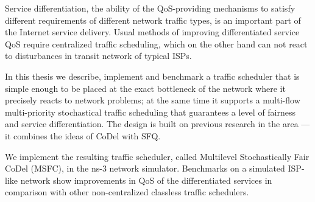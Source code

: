 Service differentiation, the ability of the QoS-providing mechanisms to satisfy different requirements of different network traffic types, is an important part of the Internet service delivery. Usual methods of improving differentiated service QoS require centralized traffic scheduling, which on the other hand can not react to disturbances in transit network of typical ISPs.

In this thesis we describe, implement and benchmark a traffic scheduler that is simple enough to be placed at the
exact bottleneck of the network where it precisely reacts to network problems; at the same time it
supports a multi-flow multi-priority stochastical traffic scheduling that guarantees a level of fairness and service differentiation. The design is built on previous research in the area --- it combines the ideas of CoDel with SFQ.  

We implement the resulting traffic scheduler, called Multilevel Stochastically Fair CoDel (MSFC), in the ns-3 network simulator. Benchmarks on a simulated ISP-like network show improvements in QoS of the differentiated services in comparison with other non-centralized classless traffic schedulers.